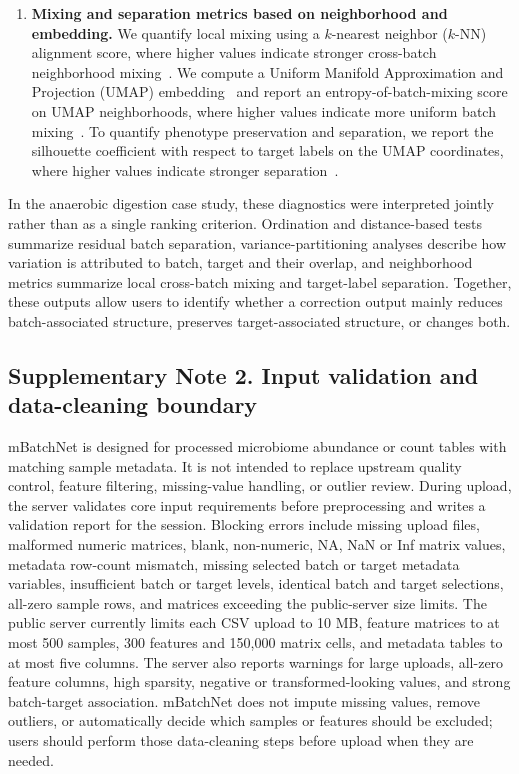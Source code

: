 \documentclass[11pt,letterpaper]{article}
\begin{document}
\begin{enumerate}
\item \textbf{Mixing and separation metrics based on neighborhood and embedding.}
We quantify local mixing using a $k$-nearest neighbor ($k$-NN) alignment score, where higher values indicate stronger cross-batch neighborhood mixing~\cite{Butler2018Seurat,Luecken2022scIB}. We compute a Uniform Manifold Approximation and Projection (UMAP) embedding~\cite{McInnes2018UMAP} and report an entropy-of-batch-mixing score on UMAP neighborhoods, where higher values indicate more uniform batch mixing~\cite{Haghverdi2018MNN,Luecken2022scIB}. To quantify phenotype preservation and separation, we report the silhouette coefficient with respect to target labels on the UMAP coordinates, where higher values indicate stronger separation~\cite{Rousseeuw1987Silhouette}.
\end{enumerate}

In the anaerobic digestion case study, these diagnostics were interpreted jointly rather than as a single ranking criterion. Ordination and distance-based tests summarize residual batch separation, variance-partitioning analyses describe how variation is attributed to batch, target and their overlap, and neighborhood metrics summarize local cross-batch mixing and target-label separation. Together, these outputs allow users to identify whether a correction output mainly reduces batch-associated structure, preserves target-associated structure, or changes both.


\subsection*{Supplementary Note 2. Input validation and data-cleaning boundary}
\label{sec:supp-validation}

mBatchNet is designed for processed microbiome abundance or count tables with matching sample metadata. It is not intended to replace upstream quality control, feature filtering, missing-value handling, or outlier review. During upload, the server validates core input requirements before preprocessing and writes a validation report for the session. Blocking errors include missing upload files, malformed numeric matrices, blank, non-numeric, NA, NaN or Inf matrix values, metadata row-count mismatch, missing selected batch or target metadata variables, insufficient batch or target levels, identical batch and target selections, all-zero sample rows, and matrices exceeding the public-server size limits. The public server currently limits each CSV upload to 10 MB, feature matrices to at most 500 samples, 300 features and 150,000 matrix cells, and metadata tables to at most five columns. The server also reports warnings for large uploads, all-zero feature columns, high sparsity, negative or transformed-looking values, and strong batch-target association. mBatchNet does not impute missing values, remove outliers, or automatically decide which samples or features should be excluded; users should perform those data-cleaning steps before upload when they are needed.
\end{document}
